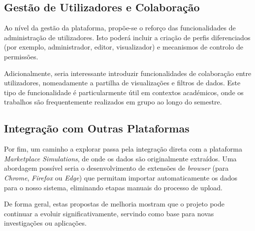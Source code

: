 \subsection{Gestão de Utilizadores e Colaboração}

Ao nível da gestão da plataforma, propõe-se o reforço das funcionalidades de administração de utilizadores. Isto poderá incluir a criação de perfis diferenciados (por exemplo, administrador, editor, visualizador) e mecanismos de controlo de permissões.

Adicionalmente, seria interessante introduzir funcionalidades de colaboração entre utilizadores, nomeadamente a partilha de visualizações e filtros de dados. Este tipo de funcionalidade é particularmente útil em contextos académicos, onde os trabalhos são frequentemente realizados em grupo ao longo do semestre.

\subsection{Integração com Outras Plataformas}

Por fim, um caminho a explorar passa pela integração direta com a plataforma \textit{Marketplace Simulations}, de onde os dados são originalmente extraídos. Uma abordagem possível seria o desenvolvimento de extensões de \textit{browser} (para \textit{Chrome}, \textit{Firefox} ou \textit{Edge}) que permitam importar automaticamente os dados para o nosso sistema, eliminando etapas manuais do processo de upload.

De forma geral, estas propostas de melhoria mostram que o projeto pode continuar a evoluir significativamente, servindo como base para novas investigações ou aplicações.